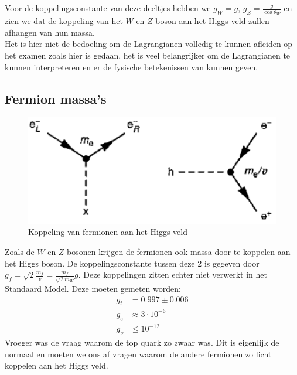\documentclass[../main.tex]{subfiles}
\begin{document}
Voor de koppelingsconstante van deze deeltjes hebben we $g_W=g$, $g_Z= \frac{g}{\cos\theta_W}$ en zien we dat de koppeling van het $W$ en $Z$ boson aan het Higgs veld zullen afhangen van hun massa.\\
{\color{red} Het is hier niet de bedoeling om de Lagrangianen volledig te kunnen afleiden op het examen zoals hier is gedaan, het is veel belangrijker om de Lagrangianen te kunnen interpreteren en er de fysische betekenissen van kunnen geven.}

\subsection{Fermion massa's}%
\label{sub:fermion_massa_s}

\begin{figure}[h]
    \centering
    \includegraphics[width=0.6\linewidth]{higgs_boson/koppeling_higgs_e.png}
    \caption{Koppeling van fermionen aan het Higgs veld}%
    \label{fig:higgs_boson/koppeling_higgs_e}
\end{figure}

Zoals de $W$ en $Z$ bosonen krijgen de fermionen ook massa door te koppelen aan het Higgs boson. De koppelingsconstante tussen deze 2 is gegeven door $g_f = \sqrt{2} \frac{m_f}{v} = \frac{m_f}{\sqrt{2}m_W} g$. Deze koppelingen zitten echter niet verwerkt in het Standaard Model. Deze moeten gemeten worden:
\begin{equation}
    \begin{aligned}
        \label{eq:kc_h_fermionen}
        g_t &= 0.997 \pm 0.006\\
        g_e &\approx 3\cdot 10^{-6}\\
        g_\nu &\leq 10^{-12}
    \end{aligned}
\end{equation}
Vroeger was de vraag waarom de top quark zo zwaar was. Dit is eigenlijk de normaal en moeten we ons af vragen waarom de andere fermionen zo licht koppelen aan het Higgs veld.
\end{document}

